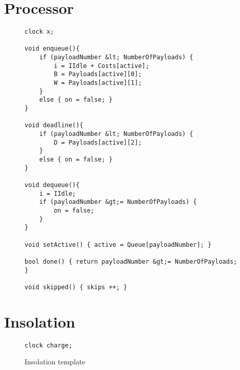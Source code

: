 \section{Processor}

\begin{figure}[H]
\begin{lstlisting}[language=my_c, caption={Declarations for Processor template}, label=lst:processor_code]
clock x;

void enqueue(){
	if (payloadNumber &lt; NumberOfPayloads) {
		i = IIdle + Costs[active];
		B = Payloads[active][0];
		W = Payloads[active][1];
	}
	else { on = false; }
}

void deadline(){
	if (payloadNumber &lt; NumberOfPayloads) {
		D = Payloads[active][2];
	}
	else { on = false; }
}

void dequeue(){
	i = IIdle;
	if (payloadNumber &gt;= NumberOfPayloads) {
		on = false;
	}
}

void setActive() { active = Queue[payloadNumber]; }

bool done() { return payloadNumber &gt;= NumberOfPayloads; }

void skipped() { skips ++; }
\end{lstlisting}
\end{figure}

\section{Insolation}
\begin{figure}[H]
	\begin{lstlisting}[language=my_c, caption={Declarations for Insolation template}, label=lst:insolation_code]
clock charge;
\end{lstlisting}
\end{figure}
\begin{figure}[H]
	\centering
	\caption{Insolation template}
	\label{fig:smc_I}
\end{figure}


